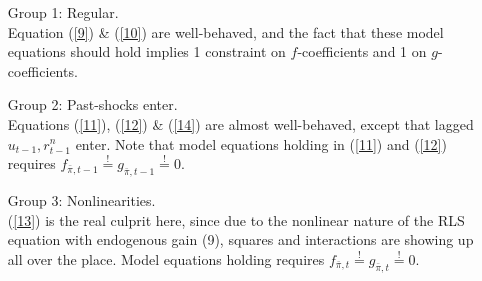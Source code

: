 \documentclass[11pt]{article}
\renewcommand{\[}{\begin{equation}}
\renewcommand{\]}{\end{equation}}
\begin{document}
\begin{enumerate}
\item[Group 1:] Regular.\\
Equation (\ref{9}) \& (\ref{10}) are well-behaved, and the fact that these model equations should hold implies 1 constraint on $f$-coefficients and 1 on $g$-coefficients.
\item[Group 2:] Past-shocks enter.\\
Equations (\ref{11}), (\ref{12}) \& (\ref{14}) are almost well-behaved, except that lagged $u_{t-1}, r_{t-1}^n$ enter. Note that model equations holding in (\ref{11}) and (\ref{12}) requires $f_{\bar{\pi},t-1}\stackrel{!}{=}g_{\bar{\pi},t-1} \overset{!}{=} 0$.
\item[Group 3:] Nonlinearities.\\
(\ref{13}) is the real culprit here, since due to the nonlinear nature of the RLS equation with endogenous gain (9), squares and interactions are showing up all over the place. Model equations holding requires $f_{\bar{\pi},t}\stackrel{!}{=}g_{\bar{\pi},t} \overset{!}{=} 0$.
\end{enumerate}
\end{document}
